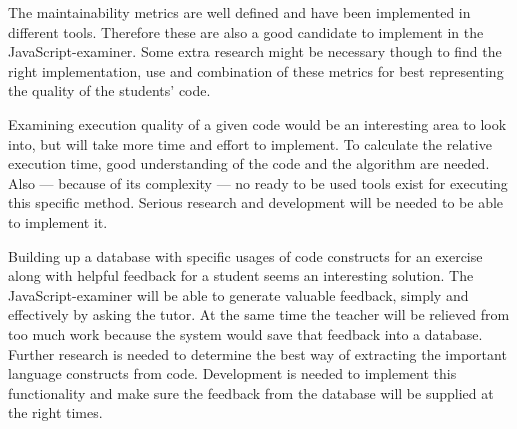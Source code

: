 \documentclass{article}
\begin{document}
The maintainability metrics are well defined and have been implemented in
different tools. Therefore these are also a good candidate to implement in
the JavaScript-examiner. Some extra research might be necessary though to find
the right implementation, use and combination of these metrics for best
representing the quality of the students' code.

Examining execution quality of a given code would be an interesting area to
look into, but will take more time and effort to implement. To calculate the
relative execution time, good understanding of the code and the algorithm are
needed. Also --- because of its complexity --- no ready to be used tools exist
for executing this specific method. Serious research and development will be
needed to be able to implement it.

Building up a database with specific usages of code constructs for an exercise
along with helpful feedback for a student seems an interesting solution. The
JavaScript-examiner will be able to generate valuable feedback, simply and
effectively by asking the tutor. At the same time the teacher will be relieved
from too much work because the system would save that feedback into a
database. Further research is needed to determine the best way of extracting
the important language constructs from code. Development is needed to implement
this functionality and make sure the feedback from the database will be
supplied at the right times.



\end{document}
